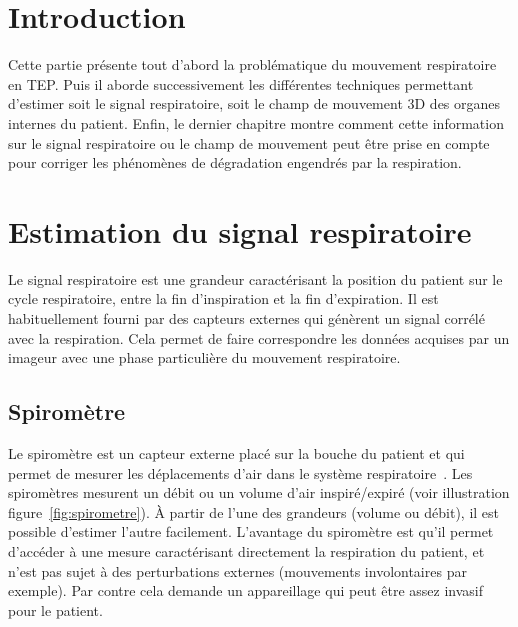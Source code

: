 \section{Introduction}

Cette partie présente tout d'abord la problématique du mouvement respiratoire en TEP. Puis il aborde successivement les différentes techniques permettant d'estimer soit le signal respiratoire, soit le champ de mouvement 3D des organes internes du patient. Enfin, le dernier chapitre montre comment cette information sur le signal respiratoire ou le champ de mouvement peut être prise en compte pour corriger les phénomènes de dégradation engendrés par la respiration.


\section{Estimation du signal respiratoire}

Le signal respiratoire est une grandeur caractérisant la position du patient sur le cycle respiratoire, entre la fin d'inspiration et la fin d'expiration. Il est habituellement fourni par des capteurs externes qui génèrent un signal corrélé avec la respiration. Cela permet de faire correspondre les données acquises par un imageur avec une phase particulière du mouvement respiratoire.

\subsection{Spiromètre}
\label{lab:spirometre}
Le spiromètre est un capteur externe placé sur la bouche du patient et qui permet de mesurer les déplacements d'air dans le système respiratoire~\cite{guivarc2004synchronization}. Les spiromètres mesurent un débit ou un volume d'air inspiré/expiré (voir illustration figure~\ref{fig:spirometre}). \`A partir de l'une des grandeurs (volume ou débit), il est possible d'estimer l'autre facilement. L'avantage du spiromètre est qu'il permet d'accéder à une mesure caractérisant directement la respiration du patient, et n'est pas sujet à des perturbations externes (mouvements involontaires par exemple). Par contre cela demande un appareillage qui peut être assez invasif pour le patient.

